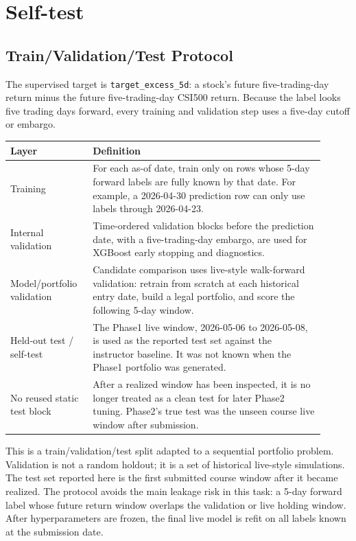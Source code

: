 \documentclass[11pt]{article}
\begin{document}
\clearpage

\section{Self-test}

\subsection{Train/Validation/Test Protocol}

The supervised target is \texttt{target\_excess\_5d}: a stock's future
five-trading-day return minus the future five-trading-day CSI500 return.
Because the label looks five trading days forward, every training and
validation step uses a five-day cutoff or embargo.

\begin{table}[h]
\centering
\begin{tabular}{p{0.23\linewidth}p{0.68\linewidth}}
\toprule
Layer & Definition \\
\midrule
Training & For each as-of date, train only on rows whose 5-day forward labels are fully known by that date. For example, a 2026-04-30 prediction row can only use labels through 2026-04-23. \\
Internal validation & Time-ordered validation blocks before the prediction date, with a five-trading-day embargo, are used for XGBoost early stopping and diagnostics. \\
Model/portfolio validation & Candidate comparison uses live-style walk-forward validation: retrain from scratch at each historical entry date, build a legal portfolio, and score the following 5-day window. \\
Held-out test / self-test & The Phase1 live window, 2026-05-06 to 2026-05-08, is used as the reported test set against the instructor baseline. It was not known when the Phase1 portfolio was generated. \\
No reused static test block & After a realized window has been inspected, it is no longer treated as a clean test for later Phase2 tuning. Phase2's true test was the unseen course live window after submission. \\
\bottomrule
\end{tabular}
\end{table}

This is a train/validation/test split adapted to a sequential portfolio
problem. Validation is not a random holdout; it is a set of historical
live-style simulations. The test set reported here is the first submitted
course window after it became realized. The protocol avoids the main leakage
risk in this task: a 5-day forward label whose future return window overlaps
the validation or live holding window. After hyperparameters are frozen, the
final live model is refit on all labels known at the submission date.
\end{document}
